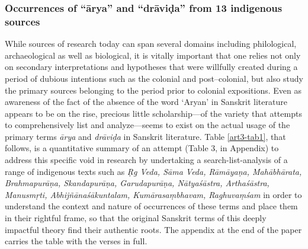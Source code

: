 \subsubsection{Occurrences of “ārya” and “drāviḍa” from 13 indigenous sources}

While sources of research today can span several domains including philological, archaeological as well as biological, it is vitally important that one relies not only on secondary interpretations and hypotheses that were willfully created during a period of dubious intentions such as the colonial and post–colonial, but also study the primary sources belonging to the period prior to colonial expositions. Even as awareness of the fact of the absence of the word ‘Aryan’ in Sanskrit literature appears to be on the rise, precious little scholarship—of the variety that attempts to comprehensively list and analyze—seems to exist on the actual usage of the primary terms \textit{ārya} and \textit{drāviḍa} in Sanskrit literature. Table \ref{art3-tab1}, that follows, is a quantitative summary of an attempt (Table 3, in Appendix) to address this specific void in research by undertaking a search-list-analysis of a range of indigenous texts such as \textit{Ṛg Veda, Sāma Veda, Rāmāyaṇa, Mahābhārata, Brahmapurāṇa, Skandapurāṇa, Garudapurāṇa, Nātyaśāstra, Arthaśāstra, Manusmṛti, Abhijñānaśākuntalam, Kumārasaṃbhavam, Raghuvaṃśam} in order to understand the context and nature of occurrences of these terms and place them in their rightful frame, so that the original Sanskrit terms of this deeply impactful theory find their authentic roots. The appendix at the end of the paper carries the table with the verses in full.

\newpage

